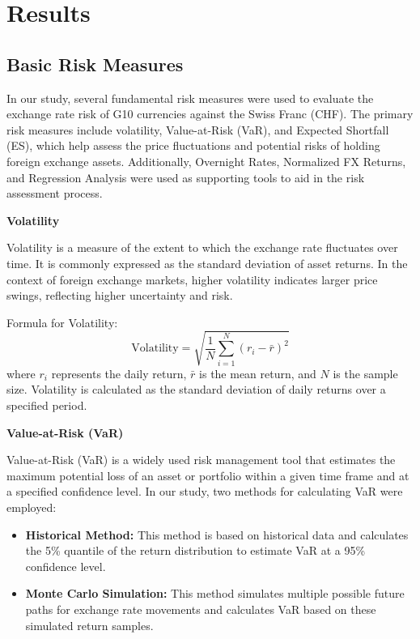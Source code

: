 \documentclass{article}
\begin{document}
\section{Results}
\subsection{Basic Risk Measures}

In our study, several fundamental risk measures were used to evaluate the exchange rate risk of G10 currencies against the Swiss Franc (CHF). The primary risk measures include volatility, Value-at-Risk (VaR), and Expected Shortfall (ES), which help assess the price fluctuations and potential risks of holding foreign exchange assets. Additionally, Overnight Rates, Normalized FX Returns, and Regression Analysis were used as supporting tools to aid in the risk assessment process.

\textbf{Volatility}

Volatility is a measure of the extent to which the exchange rate fluctuates over time. It is commonly expressed as the standard deviation of asset returns. In the context of foreign exchange markets, higher volatility indicates larger price swings, reflecting higher uncertainty and risk.

Formula for Volatility:
\[
\text{Volatility} = \sqrt{\frac{1}{N} \sum_{i=1}^{N} (r_i - \bar{r})^2}
\]
where \(r_i\) represents the daily return, \(\bar{r}\) is the mean return, and \(N\) is the sample size. Volatility is calculated as the standard deviation of daily returns over a specified period.

\textbf{Value-at-Risk (VaR)}

Value-at-Risk (VaR) is a widely used risk management tool that estimates the maximum potential loss of an asset or portfolio within a given time frame and at a specified confidence level. In our study, two methods for calculating VaR were employed:

\begin{itemize}
    \item \textbf{Historical Method:} This method is based on historical data and calculates the 5\% quantile of the return distribution to estimate VaR at a 95\% confidence level.
    \item \textbf{Monte Carlo Simulation:} This method simulates multiple possible future paths for exchange rate movements and calculates VaR based on these simulated return samples.
\end{itemize}
\end{document}
